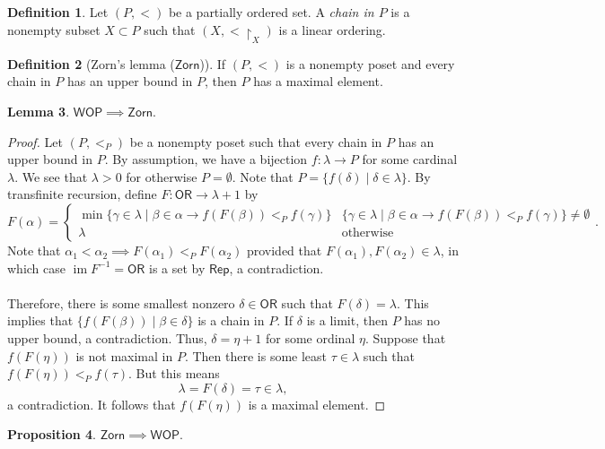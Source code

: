 \documentclass[10pt,letterpaper,cm]{nupset}
\theoremstyle{definition}
\newtheorem{definition}{Definition}[subsection]
\theoremstyle{theorem}
\newtheorem{lemma}[definition]{Lemma}
\newtheorem{prop}[definition]{Proposition}
\theoremstyle{remark}
\newcommand{\1}{\mathbf{1}}
\newcommand{\0}{\vec 0}
\newcommand{\ord}{\mathsf{OR}}
\DeclareMathOperator{\im}{im}
\begin{document}
\begin{definition}
Let $(P, <)$ be a partially ordered set. A \textit{chain in $P$} is a nonempty subset $X\subset P$ such that $(X, <\restriction_X)$ is a linear ordering. 
\end{definition}

\begin{definition}[Zorn's lemma ($\mathsf{Zorn}$)]
If $(P, <)$ is a nonempty poset and every chain in $P$ has an upper bound in $P$, then $P$ has a maximal element. 
\end{definition}

\begin{lemma}
$\mathsf{WOP} \implies \mathsf{Zorn}$.
\end{lemma}
\begin{proof} Let $(P, <_P)$ be a nonempty poset such that every chain in $P$ has an upper bound in $P$. By assumption, we have a bijection $f : \lambda \to P$ for some cardinal $\lambda$. We see that $\lambda >0$ for otherwise $P = \emptyset$. Note that $P = \{f(\delta) \mid \delta \in \lambda\}$. By transfinite recursion, define $F: \ord \to \lambda +1$ by
\[
F(\alpha) = \begin{cases}
\min\{\gamma \in \lambda \mid \beta \in \alpha \rightarrow f(F(\beta)) <_P f(\gamma)\} &\{\gamma \in \lambda \mid \beta \in \alpha \rightarrow f(F(\beta)) <_P f(\gamma)\} \ne \emptyset
\\ \lambda & \text{otherwise}
\end{cases}.
\]  Note that $\alpha_1 < \alpha _2 \implies F(\alpha_1) <_P F(\alpha_2)$ provided that $ F(\alpha_1),  F(\alpha_2) \in \lambda$, in which case $\im{F^{-1}}= \ord$ is a set by $\mathsf{Rep}$, a contradiction. 
\\ \\Therefore, there is some smallest nonzero $\delta \in \ord$ such that $F(\delta) = \lambda$. This implies that $\{f(F(\beta)) \mid \beta \in \delta\}$ is a chain in $P$. If $\delta$ is a limit, then $P$ has no upper bound, a contradiction. Thus, $\delta = \eta + 1$ for some ordinal $\eta$. Suppose that $f(F(\eta))$ is not maximal in $P$. Then there is some least $\tau \in \lambda$ such that $f(F(\eta)) <_P f(\tau)$. But this means $$\lambda = F(\delta) = \tau \in \lambda,$$ a contradiction. It follows that $f(F(\eta))$ is a maximal element.  
\end{proof}

\begin{prop}
$\mathsf{Zorn} \implies \mathsf{WOP}$.
\end{prop}
\end{document}
